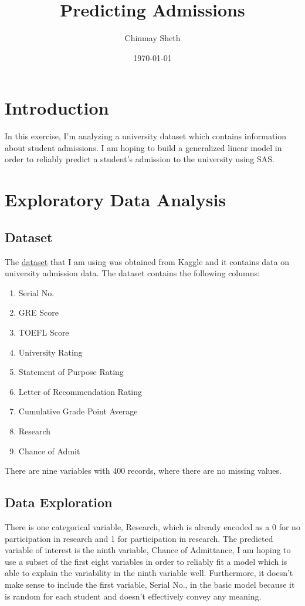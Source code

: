 \documentclass{article}
\title{Predicting Admissions}
\author{Chinmay Sheth}
\date\today
\begin{document}
\maketitle

\section*{Introduction}

In this exercise, I'm analyzing a university dataset which contains information about student admissions. I am hoping to build a generalized linear model in order to reliably predict a student's admission to the university using SAS.

\section*{Exploratory Data Analysis}

\subsection*{Dataset}

The \href{https://www.kaggle.com/mohansacharya/graduate-admissions}{dataset} that I am using was obtained from Kaggle and it contains data on university admission data. The dataset contains the following columns:

\begin{enumerate}

\item Serial No.
\item GRE Score
\item TOEFL Score
\item University Rating
\item Statement of Purpose Rating
\item Letter of Recommendation Rating
\item Cumulative Grade Point Average
\item Research
\item Chance of Admit

\end{enumerate}

There are nine variables with 400 records, where there are no missing values.

\subsection*{Data Exploration}

There is one categorical variable, Research, which is already encoded as a 0 for no participation in research and 1 for participation in research. The predicted variable of interest is the ninth variable, Chance of Admittance, I am hoping to use a subset of the first eight variables in order to reliably fit a model which is able to explain the variability in the ninth variable well. Furthermore, it doesn't make sense to include the first variable, Serial No., in the basic model because it is random for each student and doesn't effectively convey any meaning.
\end{document}
